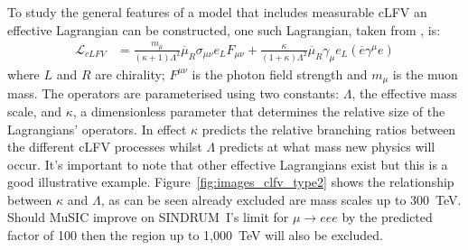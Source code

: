 To study the general features of a model that includes measurable cLFV an effective Lagrangian can be constructed, one such Lagrangian, taken from \cite{effective_lagrangian_for_clfv}, is:
\begin{align}
  \mathcal{L}_{cLFV} &= 
      \frac{m_{\mu}}{(\kappa + 1)\Lambda^2}
      \overline{\mu}_R\sigma_{\mu\nu}e_L F_{\mu\nu} + 
      \frac{\kappa}{(1+\kappa)\Lambda^2}
      \overline{\mu}_R\gamma_{\mu}e_L
      (\overline{e}\gamma^{\mu}e) \label{equ:type2}
\end{align}
where \(L\) and \(R\) are chirality; \(F^{\mu\nu}\) is the photon field strength and \( m_{\mu} \) is the muon mass. The operators are parameterised using two constants: \(\Lambda\), the effective mass scale, and \( \kappa \), a dimensionless parameter that determines the relative size of the Lagrangians' operators. In effect \(\kappa\) predicts the relative branching ratios between the different cLFV processes whilst \(\Lambda\) predicts at what mass new physics will occur. It's important to note that other effective Lagrangians exist but this is a good illustrative example. Figure~\ref{fig:images_clfv_type2} shows the relationship between \(\kappa\) and \(\Lambda\), as can be seen already excluded are mass scales up to 300~TeV. Should MuSIC improve on SINDRUM~I's limit for \( \mu\rightarrow eee \) by the predicted factor of 100 then the region up to 1,000~TeV will also be excluded. 


